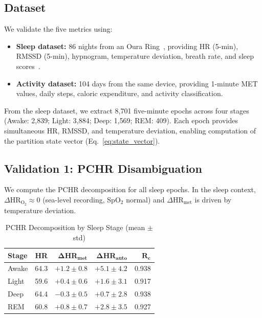 \documentclass[10pt,twocolumn,a4paper]{article}
\theoremstyle{definition}
\begin{document}
\subsection{Dataset}

We validate the five metrics using:
\begin{itemize}[nosep]
\item \textbf{Sleep dataset:} 86 nights from an Oura
  Ring~\cite{altini2021promise}, providing HR (5-min), RMSSD (5-min),
  hypnogram, temperature deviation, breath rate, and sleep
  scores~\cite{derosario2019validity}.
\item \textbf{Activity dataset:} 104 days from the same device,
  providing 1-minute MET values, daily steps, caloric expenditure,
  and activity classification.
\end{itemize}

From the sleep dataset, we extract 8{,}701 five-minute epochs across
four stages (Awake: 2{,}839; Light: 3{,}884; Deep: 1{,}569; REM: 409).
Each epoch provides simultaneous HR, RMSSD, and temperature deviation,
enabling computation of the partition state vector
(Eq.~\ref{eq:state_vector}).

\subsection{Validation 1: PCHR Disambiguation}

We compute the PCHR decomposition for all sleep epochs. In the sleep
context, $\Delta\text{HR}_{\text{O}_2} \approx 0$ (sea-level recording,
SpO$_2$ normal) and $\Delta\text{HR}_{\text{met}}$ is driven by
temperature deviation.

\begin{table}[H]
\centering
\caption{PCHR Decomposition by Sleep Stage (mean $\pm$ std)}
\label{tab:pchr_validation}
\begin{tabular}{lrrrr}
\toprule
\textbf{Stage} & \textbf{HR} & $\bm{\Delta}$\textbf{HR}$_{\textbf{met}}$
& $\bm{\Delta}$\textbf{HR}$_{\textbf{auto}}$
& \textbf{$\bm{R_c}$}\\
\midrule
Awake & 64.3 & $+1.2 \pm 0.8$ & $+5.1 \pm 4.2$ & 0.938\\
Light & 59.6 & $+0.4 \pm 0.6$ & $+1.6 \pm 3.1$ & 0.917\\
Deep  & 64.4 & $-0.3 \pm 0.5$ & $+0.7 \pm 2.8$ & 0.938\\
REM   & 60.8 & $+0.8 \pm 0.7$ & $+2.8 \pm 3.5$ & 0.927\\
\bottomrule
\end{tabular}
\end{table}
\end{document}
